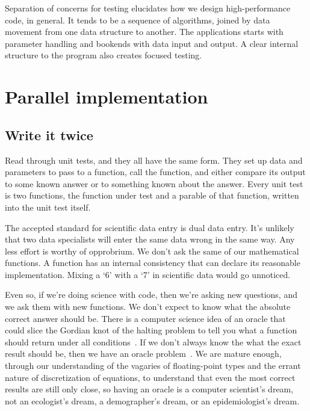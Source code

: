 \documentclass[fleqn,10pt]{olplainarticle}
\begin{document}
Separation of concerns for testing elucidates how we design
high-performance code, in general. It tends to be a sequence
of algorithms, joined by data movement from one data structure
to another. The applications starts with parameter handling
and bookends with data input and output. A clear internal structure
to the program also creates focused testing.


\section{Parallel implementation}\label{sec:parallel-implementation}
\subsection{Write it twice}\label{sec:parallel-twice}
Read through unit tests, and they all have the same form.
They set up data and parameters to pass to a function, call the
function, and either compare its output to some known answer or to
something known about the answer. Every unit test is two
functions, the function under test and a parable
of that function, written into the unit test itself.

The accepted standard for scientific data entry is dual data
entry. It's unlikely that two data specialists will enter
the same data wrong in the same way. Any less effort is
worthy of opprobrium.
We don't ask the same of our mathematical functions. A function
has an internal consistency that can declare its reasonable
implementation. Mixing a `6' with a `7' in scientific data
would go unnoticed.

Even so, if we're doing science with code, then we're asking
new questions, and we ask them with new functions. We don't
expect to know what the absolute correct answer should be.
There is a computer science idea of an oracle that could
slice the Gordian knot of the halting problem to tell you
what a function should return under all
conditions~\citep{howden1986functional}. If we don't always
know the what the exact result should be, then we have an
oracle problem~\citep{sirer1999using}. We are mature enough,
through our understanding of the vagaries of floating-point
types and the errant nature of discretization of equations,
to understand that even the most correct results are still
only close, so having an oracle is a computer scientist's
dream, not an ecologist's dream, a demographer's dream,
or an epidemiologist's dream.
\end{document}
